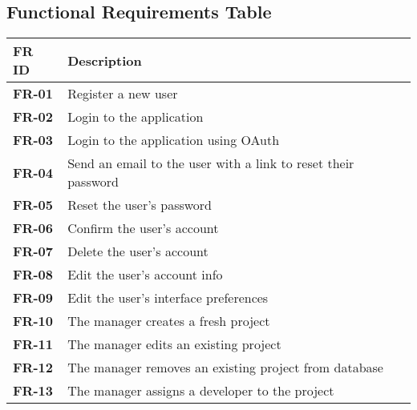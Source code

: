 
\subsection{Functional Requirements Table}
    \begin{center}
        \begin{tabularx}{\textwidth}{|l|X|}
            \hline
            \textbf{FR ID} & \textbf{Description} \\
            \hline


        \textbf{FR-01} & Register a new user \\
        \hline
    

        \textbf{FR-02} & Login to the application \\
        \hline
    

        \textbf{FR-03} & Login to the application using OAuth \\
        \hline
    

        \textbf{FR-04} & Send an email to the user with a link to reset their password \\
        \hline
    

        \textbf{FR-05} & Reset the user's password \\
        \hline
    

        \textbf{FR-06} & Confirm the user's account \\
        \hline
    

        \textbf{FR-07} & Delete the user's account \\
        \hline
    

        \textbf{FR-08} & Edit the user's account info \\
        \hline
    

        \textbf{FR-09} & Edit the user's interface preferences \\
        \hline
    

        \textbf{FR-10} & The manager creates a fresh project \\
        \hline
    

        \textbf{FR-11} & The manager edits an existing project \\
        \hline
    

        \textbf{FR-12} & The manager removes an existing project from database \\
        \hline
    

        \textbf{FR-13} & The manager assigns a developer to the project \\
        \hline
    


\end{tabularx}
\end{center}
